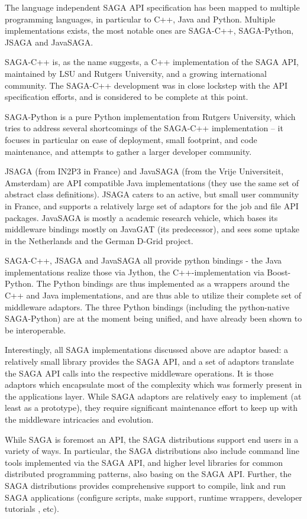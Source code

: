\documentclass[twocolumn]{svjour3}       %
\begin{document}
The language independent SAGA API specification has been mapped to multiple programming languages, in particular to C++, Java and Python.  Multiple implementations exists, the most notable ones are SAGA-C++, SAGA-Python, JSAGA and JavaSAGA.

SAGA-C++ is, as the name suggests, a C++ implementation of the SAGA API, maintained by LSU and Rutgers University, and a growing international community.  The SAGA-C++ development was in close lockstep with the API specification efforts, and is considered to be complete at this point.

SAGA-Python is a pure Python implementation from Rutgers University, which tries to address several shortcomings of the SAGA-C++ implementation -- it focuses in particular on ease of deployment, small footprint, and code maintenance, and attempts to gather a larger developer community.
  
JSAGA (from IN2P3 in France) and JavaSAGA (from the Vrije Universiteit, Amsterdam) are API compatible Java implementations (they use the same set of abstract class definitions).  JSAGA caters to an active, but small user community in France, and supports a relatively large set of adaptors for the job and file API packages.  JavaSAGA is mostly a academic research vehicle, which bases its middleware bindings mostly on JavaGAT (its predecessor), and sees some uptake in the Netherlands and the German D-Grid project.

SAGA-C++, JSAGA and JavaSAGA all provide python bindings - the Java implementations realize those via Jython, the C++-implementation via Boost-Python.    The Python bindings are thus implemented as a wrappers around the C++ and Java implementations, and are thus able to utilize their complete set of middleware adaptors. The three Python bindings (including the python-native SAGA-Python) are at the moment being unified, and have already been shown to be interoperable.

Interestingly, all SAGA implementations discussed above are adaptor based: a relatively small library provides the SAGA API, and a set of adaptors translate the SAGA API calls into the respective middleware operations.  It is those adaptors which encapsulate most of the complexity which was formerly present in the applications layer.  While SAGA adaptors are relatively easy to implement (at least as a prototype), they require significant maintenance effort to keep up with the middleware intricacies and evolution.

While SAGA is foremost an API, the SAGA distributions support end users in a variety of ways.  In particular, the SAGA distributions also include command line tools implemented via the SAGA API, and higher level libraries for common distributed programming patterns, also basing on the SAGA API.  Further, the SAGA distributions provides comprehensive support to compile, link and run SAGA applications (configure scripts, make support, runtime wrappers, developer tutorials , etc).
\end{document}
